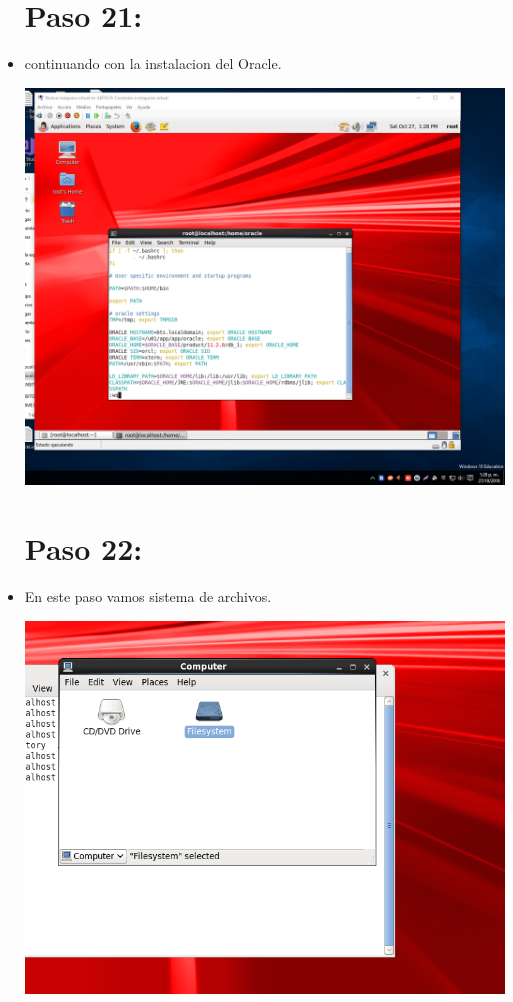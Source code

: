 \documentclass{article}
\begin{document}
\begin{itemize}
\newpage
\section{Paso 21:}
	\item continuando con la instalacion del Oracle.
	\begin{center}
	\includegraphics[width=13cm]{./Imagenes/imagen21} 
	\end{center}

\section{Paso 22:}
	\item En este paso vamos sistema de archivos. 
	\begin{center}
	\includegraphics[width=13cm]{./Imagenes/imagen22} 
	\end{center}
	

\end{itemize}
\end{document}
